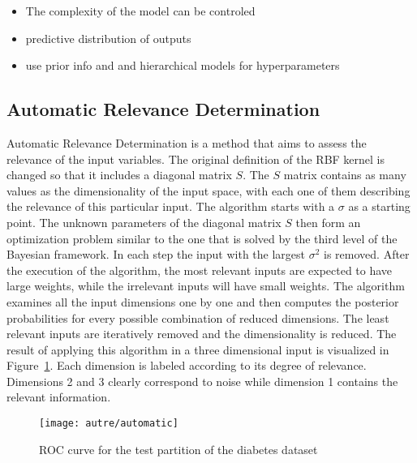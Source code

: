 \documentclass[conference,compsoc]{IEEEtran}
\begin{document}
\begin{itemize}

\item The complexity of the model can be controled 
\item predictive distribution of outputs
\item use prior info and and hierarchical models for hyperparameters
\end{itemize}

%

\subsection{Automatic Relevance Determination}
Automatic Relevance Determination is a method that aims to assess the relevance of the input variables. The original definition of the RBF kernel is changed so that it includes a diagonal matrix $S$. The $S$ matrix contains as many values as the dimensionality of the input space, with each one of them describing the relevance of this particular input. The algorithm starts with a $\sigma$ as a starting point. The unknown parameters of the diagonal matrix $S$ then form an optimization problem similar to the one that is solved by the third level of the Bayesian framework. In each step the input with the largest $\sigma^2$ is removed. After the execution of the algorithm, the most relevant inputs are expected to have large weights, while the irrelevant inputs will have small weights. The algorithm examines all the input dimensions one by one and then computes the posterior probabilities for every possible combination of reduced dimensions. The least relevant inputs are iteratively removed and the dimensionality is reduced. The result of applying this algorithm in a three dimensional input is visualized in Figure~\ref{fig:aut}. Each dimension is labeled according to its degree of relevance. Dimensions 2 and 3 clearly correspond to noise while dimension 1 contains the relevant information.



\begin{figure}[]
				\centering
            \texttt{[image: autre/automatic]}
      
        \caption{ ROC curve for the test partition of the diabetes dataset }        
                   
        \label{fig:aut}
    \end{figure}
\end{document}
